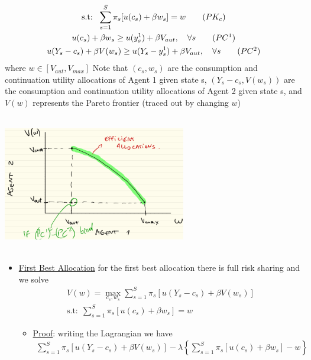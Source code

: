 \documentclass{article}
\begin{document}
\begin{itemize}
\begin{gather*}
        \text{s.t:} \ \ \sum_{s=1}^{S} \pi_{s} [u(c_{s}) + \beta w_{s}] = w \tag{$PK_{c}$}\\
        u(c_{s}) + \beta w_{s} \geq u(y_{s}^{1}) + \beta V_{aut}, \ \ \ \forall s \tag{$PC^{1}$} \\
        u(Y_{s} - c_{s}) + \beta V(w_{s}) \geq u(Y_{s} - y_{s}^{1}) + \beta V_{aut}, \ \ \ \forall s \tag{$PC^{2}$}
    \end{gather*}
    where $w \in [V_{aut}, V_{max}]$
    Note that $(c_{s}, w_{s})$ are the consumption and continuation utility allocations of Agent 1 given state s, $(Y_{s} - c_{s}, V(w_{s}))$ are the consumption and continuation utility allocations of Agent 2 given state s, and $V(w)$ represents the Pareto frontier (traced out by changing $w$)
    \newline
    \begin{center}
    \includegraphics[width=8cm, height=6cm]{pic16}
    \end{center}
    \begin{itemize}
        \item  \underline{First Best Allocation} for the first best allocation there is full risk sharing and we solve
        \begin{gather*}
            V(w) = \max_{c_{s}, w_{s}} \sum_{s=1}^{S} \pi_{s} [u(Y_{s} - c_{s}) + \beta V(w_{s})] \\
            \text{s.t:} \ \ \sum_{s=1}^{S} \pi_{s} [u(c_{s}) + \beta w_{s}] = w
        \end{gather*}
        \begin{itemize}
            \item  \underline{Proof}: writing the Lagrangian we have
            \begin{gather*}
                \sum_{s=1}^{S} \pi_{s} [u(Y_{s} - c_{s}) + \beta V(w_{s})] - \lambda \left\{\sum_{s=1}^{S} \pi_{s} [u(c_{s}) + \beta w_{s}] - w \right\}
            \end{gather*}

\end{itemize}
\end{itemize}
\end{itemize}
\end{document}
